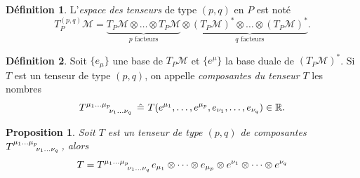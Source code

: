 \documentclass[a4paper,11pt]{report}
\theoremstyle{definition}
\theoremstyle{plain}
\newtheorem{prop}[thm]{Proposition}
\theoremstyle{definition}
\newtheorem{defn}{Définition}[chapter]
\theoremstyle{remark}
\newcommand{\M}{\mathscr{M}}
\begin{document}
                \begin{defn}
                    L'\textit{espace des tenseurs} de type $(p,q)$ en $P$ est noté
                    \begin{equation}
                        T^{(p,q)}_P\M = \underbrace{T_P\M\otimes\dots\otimes T_P\M}_{\text{$p$ facteurs}}\otimes \underbrace{(T_P\M)^*\otimes\dots\otimes (T_P\M)^*}_{\text{$q$ facteurs}}.
                    \end{equation}
                \end{defn}
                
                \begin{defn}
                    Soit $\{e_\mu\}$ une base de $T_P\M$ et $\{e^\mu\}$ la base duale de $(T_P\M)^*$. Si $T$ est un tenseur de type $(p,q)$, on appelle \textit{composantes du tenseur} $T$ les nombres
                    \begin{equation}
                        T\indices{^{\mu_1\dots\mu_p}_{\nu_1\dots\nu_q}}~\hat{=}~T(e^{\mu_1},\dots,e^{\mu_p},e_{\nu_1},\dots,e_{\nu_q})\in\mathbb{R}.
                    \end{equation}
                \end{defn}
                
                \begin{prop}
                    Soit $T$ est un tenseur de type $(p,q)$ de composantes $T\indices{^{\mu_1\dots\mu_p}_{\nu_1\dots\nu_q}}$, alors
                    \begin{equation}
                        T = T\indices{^{\mu_1\dots\mu_p}_{\nu_1\dots\nu_q}} e_{\mu_1}\otimes\dots\otimes e_{\mu_p}\otimes e^{\nu_1}\otimes\dots\otimes e^{\nu_q}
                    \end{equation}
                \end{prop}
                
\end{document}
